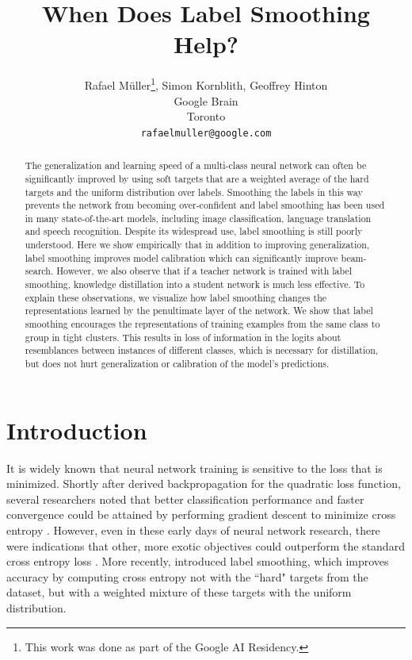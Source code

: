 \documentclass{article}
\title{When Does Label Smoothing Help?}
\author{%
  Rafael M{\"u}ller\thanks{This work was done as part of the Google AI Residency.}, Simon Kornblith, Geoffrey Hinton \\
  Google Brain\\
  Toronto\\
  \texttt{rafaelmuller@google.com} \\
}
\begin{document}
\maketitle

\begin{abstract}
The generalization and learning speed of a multi-class neural network can often be significantly improved by using soft targets that are a weighted average of the hard targets and the uniform distribution over labels. Smoothing the labels in this way prevents the network from becoming over-confident and label smoothing has been used in many state-of-the-art models, including image classification, language translation and speech recognition. Despite its widespread use, label smoothing is still poorly understood. Here we show empirically that in addition to improving generalization, label smoothing improves model calibration which can significantly improve beam-search. However, we also observe that if a teacher network is trained with label smoothing, knowledge distillation into a student network is much less effective.  To explain these observations, we visualize how label smoothing changes the  representations learned by the penultimate layer of the network. We show that label smoothing encourages the representations of training examples from the same class to group in tight clusters. This results in loss of information in the logits about resemblances between instances of different classes, which is necessary for distillation, but does not hurt generalization or calibration of the model's predictions.

\end{abstract}

\section{Introduction}


It is widely known that neural network training is sensitive to the loss that is minimized. Shortly after \citet{rumelhart1986learning} derived backpropagation for the quadratic loss function, several researchers noted that better classification performance and faster convergence could be attained by performing gradient descent to minimize cross entropy \citep{baum1988supervised,solla1988accelerated}. However, even in these early days of neural network research, there were indications that other, more exotic objectives could outperform the standard cross entropy loss \citep{fahlman1988empirical,hertz1991introduction}.
More recently, \citet{szegedy2016rethinking} introduced label smoothing, which improves accuracy by computing cross entropy not with the ``hard" targets from the dataset, but with a weighted mixture of these targets with the uniform distribution.
\end{document}
